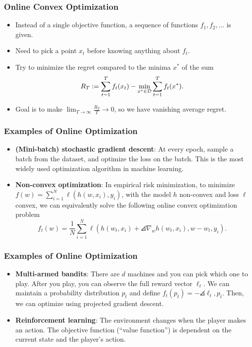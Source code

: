 \documentclass{beamer}
\begin{document}
\begin{frame}
    \frametitle{Online Convex Optimization}
    \begin{itemize}
        \item Instead of a single objective function, a sequence of functions $f_1, f_2, \dots$ is given.
        \item Need to pick a point $x_t$ before knowing anything about $f_t$.
        \item Try to minimize the regret compared to the minima $x^*$ of the sum
        \[
            R_T := \sum_{t=1}^T f_t(x_t) - \min_{x^* \in \mathcal{D}} \sum_{t=1}^T f_t(x^*).
        \]
        \item Goal is to make $\lim_{T \to \infty} \frac{R_T}{T} \to 0$, so we have vanishing average regret.
    \end{itemize}
\end{frame}

\begin{frame}
    \frametitle{Examples of Online Optimization}
    \begin{itemize}
        \item \textbf{(Mini-batch) stochastic gradient descent}: At every epoch, sample a batch from the dataset, and optimize the loss on the batch. This is the most widely used optimization algorithm in machine learning.
        \item \textbf{Non-convex optimization}: In empirical risk minimization, to minimize $f(w) = \sum_{i=1}^N \ell(h(w, x_i), y_i)$, with the model $h$ non-convex and loss $\ell$ convex, we can equivalently solve the following online convex optimization problem
        \[
            f_t(w) = \frac{1}{N} \sum_{i=1}^N \ell(h(w_t, x_i) + \angles{\nabla_w h(w_t, x_i), w - w_t}, y_i).
        \]
    \end{itemize}
\end{frame}

\begin{frame}
    \frametitle{Examples of Online Optimization}
    \begin{itemize}
        \item \textbf{Multi-armed bandits}: There are $d$ machines and you can pick which one to play. After you play, you can observe the full reward vector $\ell_t$. We can maintain a probability distribution $p_t$ and define $f_t(p_t) = -\angles{\ell_t, p_t}$. Then, we can optimize using projected gradient descent.
        \item \textbf{Reinforcement learning}: The environment changes when the player makes an action. The objective function (``value function'') is dependent on the current state and the player's action.
    \end{itemize}
\end{frame}
\end{document}
